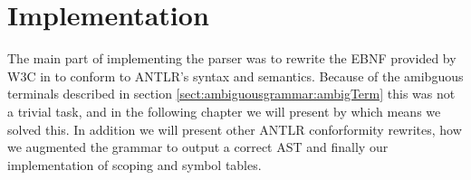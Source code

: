 \chapter{Implementation}


The main part of implementing the parser was to rewrite the EBNF provided by W3C in \cite{w3c01} to conform to ANTLR's syntax and semantics. Because of the amibguous terminals described in section \ref{sect:ambiguousgrammar:ambigTerm} this was not a trivial task, and in the following chapter we will present by which means we solved this. In addition we will present other ANTLR conforformity rewrites, how we augmented the grammar to output a correct AST and finally our implementation of scoping and symbol tables.







